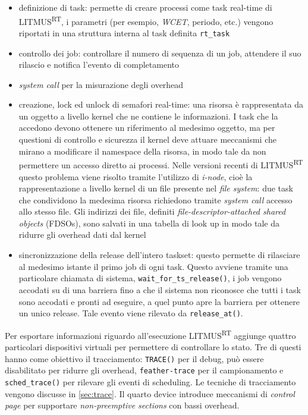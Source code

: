 \begin{appendices}
\begin{itemize}
	\item definizione di task: permette di creare processi come task real-time di LITMUS\textsuperscript{RT}, i parametri (per esempio, \textit{WCET}, periodo, etc.) vengono riportati in una struttura interna al task definita \texttt{rt\_task}
	\item controllo dei job: controllare il numero di sequenza di un job, attendere il suo rilascio e notifica l'evento di completamento
	\item \textit{system call} per la misurazione degli overhead
	\item creazione, lock ed unlock di semafori real-time: una risorsa è rappresentata da un oggetto a livello kernel che ne contiene le informazioni. I task che la accedono devono ottenere un riferimento al medesimo oggetto, ma per questioni di controllo e sicurezza il kernel deve attuare meccanismi che mirano a modificare il namespace della risorsa, in modo tale da non permettere un accesso diretto ai processi. Nelle versioni recenti di LITMUS\textsuperscript{RT} questo problema viene risolto tramite l'utilizzo di \textit{i-node}, cioè la rappresentazione a livello kernel di un file presente nel \textit{file system}: due task che condividono la medesima risorsa richiedono tramite \textit{system call} accesso allo stesso file. Gli indirizzi dei file, definiti \textit{file-descriptor-attached shared objects} (FDSOs), sono salvati in una tabella di look up in modo tale da ridurre gli overhead dati dal kernel
	\item sincronizzazione della release dell'intero taskset: questo permette di rilasciare al medesimo istante il primo job di ogni task. Questo avviene tramite una particolare chiamata di sistema, \texttt{wait\_for\_ts\_release()}, i job vengono accodati su di una barriera fino a che il sistema non riconosce che tutti i task sono accodati e pronti ad eseguire, a quel punto apre la barriera per ottenere un unico release. Tale evento viene rilevato da \texttt{release\_at()}.\\
\end{itemize}

\noindent Per esportare informazioni riguardo all'esecuzione LITMUS\textsuperscript{RT} aggiunge quattro particolari dispositivi virtuali per permettere di controllare lo stato. Tre di questi hanno come obiettivo il tracciamento: \texttt{TRACE()} per il debug, può essere disabilitato per ridurre gli overhead, \texttt{feather-trace} per il campionamento e \texttt{sched\_trace()} per rilevare gli eventi di scheduling. Le tecniche di tracciamento vengono discusse in \ref{sec:trace}. Il quarto device introduce meccanismi di \textit{control page} per supportare \textit{non-preemptive sections} con bassi overhead.\\


\end{appendices}
